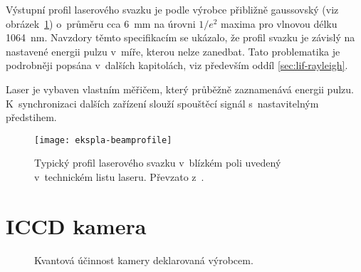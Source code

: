 Výstupní profil laserového svazku je podle výrobce přibližně gaussovský
(viz obrázek~\ref{fig:instruments-beamprofile})
o~průměru cca \SI{6}{\milli\metre} na úrovni $1/e^2$ maxima
pro vlnovou délku \SI{1064}{\nano\metre}.
\autocite{ekspla-datasheet}
Navzdory těmto specifikacím se ukázalo, že profil svazku je závislý
na nastavené energii pulzu v~míře, kterou nelze zanedbat.
Tato problematika je podrobněji popsána v~dalších kapitolách,
viz především oddíl \ref{sec:lif-rayleigh}.

Laser je vybaven vlastním měřičem, který průběžně zaznamenává energii pulzu.
K~synchronizaci dalších zařízení slouží spouštěcí signál s~nastavitelným
předstihem.\autocite{ekspla-datasheet}

\begin{figure}[htp]
	\centering
	\texttt{[image: ekspla-beamprofile]}
	\caption{Typický profil laserového svazku v~blízkém poli
		uvedený v~technickém listu laseru.
		Převzato z~\cite{ekspla-datasheet}.}
	\label{fig:instruments-beamprofile}
\end{figure}

\section{ICCD kamera }
\label{sec:instruments-iccd}

\begin{figure}[htp]
	\centering
	
	\caption{Kvantová účinnost kamery deklarovaná výrobcem.}
	\label{fig:instruments-cameraeff}
\end{figure}
